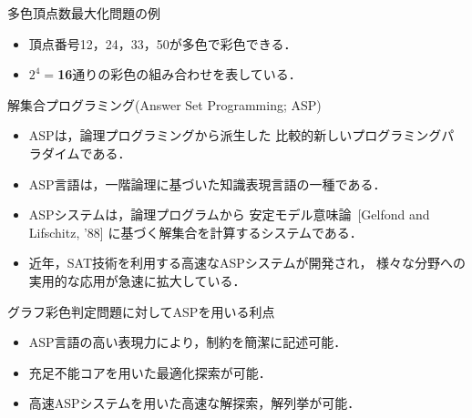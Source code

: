 \documentclass[dvipdfmx,11pt]{beamer}
\begin{document}
\begin{frame}{多色頂点数最大化問題の例}
 \begin{alertblock}{}
  \begin{itemize}
   \item 頂点番号12，24，33，50が多色で彩色できる．
   \item $2^4=$\alert{\textbf{16}}通りの彩色の組み合わせを表している．
  \end{itemize}
 \end{alertblock}

\end{frame}


\begin{frame}{解集合プログラミング(Answer Set Programming; ASP)}

 \begin{itemize}
  \item \alert{ASP}は，論理プログラミングから派生した
        比較的新しいプログラミングパラダイムである．
  \item \alert{ASP言語}は，一階論理に基づいた知識表現言語の一種である．
  \item \alert{ASPシステム}は，論理プログラムから
        安定モデル意味論~{\scriptsize[Gelfond and Lifschitz, '88]}
        に基づく解集合を計算するシステムである．
  \item 近年，SAT技術を利用する高速なASPシステムが開発され，
        様々な分野への実用的な応用が急速に拡大している．
 \end{itemize}
 
 \begin{alertblock}{グラフ彩色判定問題に対してASPを用いる利点}
  \begin{itemize}
   \item ASP言語の高い表現力により，制約を簡潔に記述可能．
   \item 充足不能コアを用いた最適化探索が可能．
   \item 高速ASPシステムを用いた高速な解探索，解列挙が可能．
  \end{itemize}
 \end{alertblock}
 
\end{frame}

\end{document}
